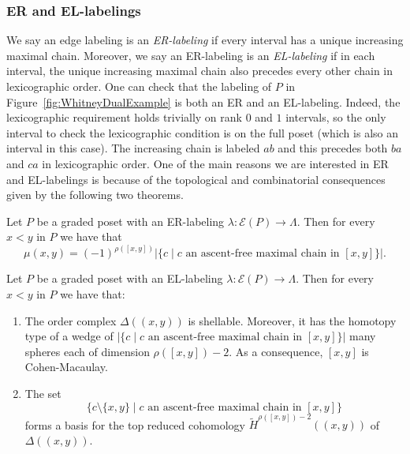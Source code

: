 \subsubsection{ER and EL-labelings}
We say an edge labeling is an \emph{ER-labeling} if every interval has a unique increasing maximal chain.  Moreover, we say an ER-labeling is an \emph{EL-labeling} if in each interval, the unique increasing maximal chain also precedes every other chain in lexicographic order.  One can check that the labeling of $P$ in   Figure~\ref{fig:WhitneyDualExample} is both an ER and an EL-labeling. Indeed, the lexicographic requirement holds trivially on rank $0$ and $1$ intervals, so the only interval to check the  lexicographic condition is on the full poset (which is also an interval in this case).  The increasing chain is labeled $ab$ and this precedes both $ba$ and $ca$ in lexicographic order.   One of the main reasons we are interested in ER and EL-labelings is because of the topological and combinatorial consequences given by the following two theorems. 

\begin{theo}
\label{theorem:stanley_mobius}
  Let $P$ be a graded poset  with an ER-labeling $\lambda: \mathcal{E}(P) \rightarrow \Lambda$. Then  for  every $x<y$ in $P$  we have that
     $$
     \mu(x,y) = (-1)^{\rho([x,y])} |\{c\mid c \mbox{ an ascent-free maximal chain in  }[x,y]\}|.
     $$
\end{theo}


\begin{theo}  \label{theorem:bjorner_wachs}
  Let $P$ be a graded poset  with an EL-labeling $\lambda: \mathcal{E}(P) \rightarrow \Lambda$. Then for  every $x<y$ in $P$  we have that:
 \begin{enumerate}
   \item   The order complex $\Delta((x,y))$ is shellable. Moreover, it has the homotopy type of a wedge of $|\{c\mid c\mbox{ an ascent-free maximal chain in }[x,y]\}|$ many spheres each of dimension $\rho([x,y])-2$. As a consequence, $[x,y]$ is Cohen-Macaulay.

\item The set
$$ \{c\setminus \{x,y\} \mid c \mbox{ an ascent-free maximal  chain in  }[x,y]\}$$ forms a basis for the top reduced cohomology $\widetilde H^{\rho([x,y])-2}((x,y))$ of  $\Delta((x,y))$.
 \end{enumerate}
\end{theo}

